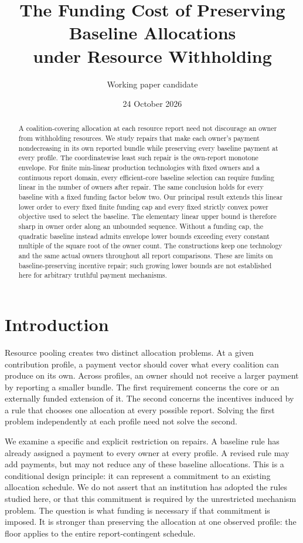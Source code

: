 \documentclass[11pt]{article}
\title{The Funding Cost of Preserving Baseline Allocations\\under Resource Withholding}
\author{Working paper candidate}
\date{24 October 2026}
\theoremstyle{definition}
\theoremstyle{remark}
\begin{document}
\maketitle
\begin{abstract}
A coalition-covering allocation at each resource report need not discourage an
owner from withholding resources. We study repairs that make each owner's payment
nondecreasing in its own reported bundle while preserving every baseline payment
at every profile. The coordinatewise least such repair is the own-report monotone
envelope. For finite min-linear production technologies with fixed owners and a
continuous report domain, every efficient-core baseline selection can require
funding linear in the number of owners after repair. The same conclusion holds
for every baseline with a fixed funding factor below two. Our principal result
extends this linear lower order to every fixed finite funding cap and every fixed
strictly convex power objective used to select the baseline. The elementary
linear upper bound is therefore sharp in owner order along an unbounded sequence.
Without a funding cap, the quadratic baseline instead admits envelope lower
bounds exceeding every constant multiple of the square root of the owner count.
The constructions keep one technology and the same actual owners throughout all
report comparisons. These are limits on baseline-preserving incentive repair;
such growing lower bounds are not established here for arbitrary truthful
payment mechanisms.
\end{abstract}

\section{Introduction}
Resource pooling creates two distinct allocation problems. At a given contribution
profile, a payment vector should cover what every coalition can produce on its
own. Across profiles, an owner should not receive a larger payment by reporting
a smaller bundle. The first requirement concerns the core or an externally funded
extension of it. The second concerns the incentives induced by a rule that chooses
one allocation at every possible report. Solving the first problem independently
at each profile need not solve the second.

We examine a specific and explicit restriction on repairs. A baseline rule has
already assigned a payment to every owner at every profile. A revised rule may
add payments, but may not reduce any of these baseline allocations. This is a
conditional design principle: it can represent a commitment to an existing
allocation schedule. We do not assert that an institution has adopted the rules
studied here, or that this commitment is required by the unrestricted mechanism
problem. The question is what funding is necessary if that commitment is imposed.
It is stronger than preserving the allocation at one observed profile: the floor
applies to the entire report-contingent schedule.
\end{document}

